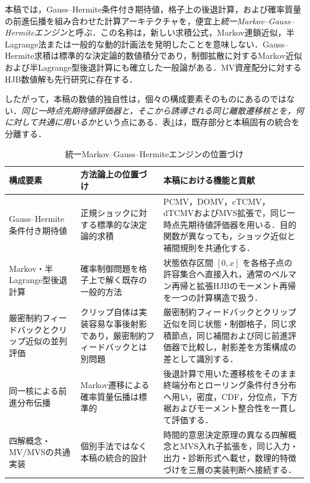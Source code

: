 \documentclass[10pt,a4paper]{article}
\theoremstyle{plain}
\theoremstyle{definition}
\begin{document}
本稿では，Gauss--Hermite条件付き期待値，格子上の後退計算，および確率質量の前進伝播を組み合わせた計算アーキテクチャを，便宜上\emph{統一Markov--Gauss--Hermiteエンジン}と呼ぶ．この名称は，新しい求積公式，Markov連鎖近似，半Lagrange法または一般的な動的計画法を発明したことを意味しない．Gauss--Hermite求積は標準的な決定論的数値積分であり\citep{AbramowitzStegun1972,Judd1998}，制御拡散に対するMarkov近似および半Lagrange型後退計算にも確立した一般論がある\citep{KushnerDupuis2001,FalconeFerretti2014}．MV資産配分に対するHJB数値解も先行研究に存在する\citep{WangForsyth2012,WangForsyth2012Comparison}．

したがって，本稿の数値的独自性は，個々の構成要素そのものにあるのではない．\emph{同じ一時点先期待値評価器と，そこから誘導される同じ離散遷移核とを，何に対して共通に用いるか}という点にある．表\ref{tab:gh-engine-positioning}は，既存部分と本稿固有の統合を分離する．

\begin{table}[H]
\centering\small
\caption{統一Markov--Gauss--Hermiteエンジンの位置づけ}
\label{tab:gh-engine-positioning}
\begin{tabularx}{\textwidth}{p{34mm}p{43mm}X}
\toprule
構成要素 & 方法論上の位置づけ & 本稿における機能と貢献 \\
\midrule
Gauss--Hermite条件付き期待値
& 正規ショックに対する標準的な決定論的求積
& PCMV，DOMV，cTCMV，dTCMVおよびMVS拡張で，同じ一時点先期待値評価器を用いる．目的関数が異なっても，ショック近似と補間規則を共通化する．\\
Markov・半Lagrange型後退計算
& 確率制御問題を格子上で解く既存の一般的方法
& 状態依存区間 $[0,x]$ を各格子点の許容集合へ直接入れ，通常のベルマン再帰と拡張HJBのモーメント再帰を一つの計算構造で扱う．\\
厳密制約フィードバックとクリップ近似の並列評価
& クリップ自体は実装容易な事後射影であり，厳密制約フィードバックとは別問題
& 厳密制約フィードバックとクリップ近似を同じ状態・制御格子，同じ求積節点，同じ補間および同じ前進評価器で比較し，射影差を方策構成の差として識別する．\\
同一核による前進分布伝播
& Markov遷移による確率質量伝播は標準的
& 後退計算で用いた遷移核をそのまま終端分布とローリング条件付き分布へ用い，密度，CDF，分位点，下方裾およびモーメント整合性を一貫して評価する．\\
四解概念・MV/MVSの共通実装
& 個別手法ではなく本稿の統合的設計
& 時間的意思決定原理の異なる四解概念とMVS入れ子拡張を，同じ入力・出力・診断形式へ載せ，数理的特徴づけを三層の実装判断へ接続する．\\
\bottomrule
\end{tabularx}
\end{table}
\end{document}
